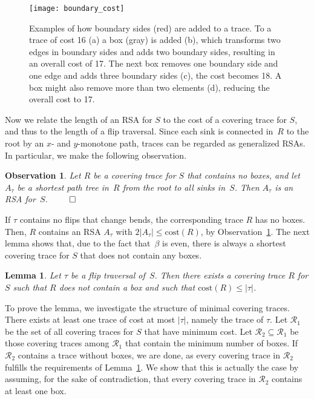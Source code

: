 \documentclass[a4paper,11pt]{article}
\newtheorem{lemma}[theorem]{Lemma}
\newtheorem{observation}[theorem]{Observation}
\newcommand{\noproof}{~\hfill$\qed$}
\begin{document}
\begin{figure}[ht]
\centering
\texttt{[image: boundary\_cost]}
\caption{Examples of how boundary sides (red) are added to a trace.
To a trace of cost 16 (a) a box (gray) is added (b), which transforms 
two edges in boundary sides and adds two boundary sides, resulting in 
an overall cost of 17.
The next box removes one boundary side and one edge and adds three 
boundary sides (c), the cost becomes 18.
A box might also remove more than two elements (d), reducing the overall 
cost to 17.
}
\label{fig_boundary_cost}
\end{figure}

Now we relate the length of an RSA for $S$ to the cost of a covering trace for $S$, and thus to the length of a flip traversal.
Since each sink is connected in~$R$ to the root by an $x$- and $y$-monotone path, traces can be regarded as generalized RSAs.
In particular, we make the following observation.

\begin{observation}\label{obs_arborescence_in_trace}
Let $R$ be a covering trace for $S$ that contains no boxes, and
let $A_{\tau}$ be a shortest path tree in~$R$ from the root to
all sinks in~$S$.
Then $A_{\tau}$  is an RSA for~$S$.\noproof
\end{observation}

If $\tau$ contains no flips that change bends, the corresponding trace $R$ has no boxes. 
Then, $R$ contains an RSA $A_{\tau}$ with $2|A_{\tau}| \leq \text{cost}(R)$, by Observation~\ref{obs_arborescence_in_trace}.
The next lemma shows that, due to the fact that~$\beta$ is even, there is always a shortest covering trace for $S$ that does not contain any boxes.

\begin{lemma}\label{lem:eliminate_chain_phase}
Let $\tau$ be a flip traversal of~$S$.
Then there exists a covering trace $R$ for $S$ 
such that $R$ does not contain a box and such that $\text{cost}(R) \leq |\tau|$.
\end{lemma}
To prove the lemma, we investigate the structure of minimal covering traces.
There exists at least one trace of cost at most $|\tau|$, namely the trace of $\tau$.
Let $\mathcal{R}_1$ be the set of all covering traces for $S$ that have minimum cost.
Let $\mathcal{R}_2 \subseteq \mathcal{R}_1$ be those covering traces among $\mathcal{R}_1$ that contain the  minimum number of boxes.
If $\mathcal{R}_2$ contains a trace without boxes, we are done, as every covering trace in $\mathcal{R}_2$ fulfills the requirements of Lemma~\ref{lem:eliminate_chain_phase}.
We show that this is actually the case by assuming, for the sake of contradiction, that every covering trace in $\mathcal{R}_2$ contains at least one box.
\end{document}
